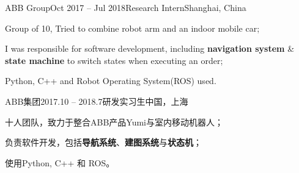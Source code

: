 \ifx\lang\eng
	\begin{rSubsection}{ABB Group}{Oct 2017 – Jul 2018}{Research Intern}{Shanghai, China}
		\item Group of 10, Tried to combine robot arm and an indoor mobile car;
		\item I was responsible for software development, including \textbf{navigation system} \& \textbf{state machine} to switch states when executing an order;
		\item Python, C++ and Robot Operating System(ROS) used.
	\end{rSubsection}
\else
	\begin{rSubsection}{ABB集团}{2017.10 – 2018.7}{研发实习生}{中国，上海}
		\item 十人团队，致力于整合ABB产品Yumi与室内移动机器人；
		\item 负责软件开发，包括\textbf{导航系统}、\textbf{建图系统}与\textbf{状态机}；
		\item 使用Python, C++ 和 ROS。
	\end{rSubsection}
\fi